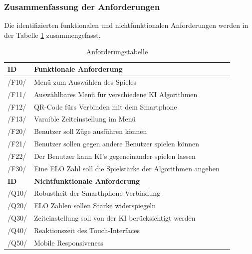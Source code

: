 \documentclass[12pt,a4paper,bibliography=totocnumbered,listof=totocnumbered]{article}
\begin{document}
\begin{appendix}
\subsubsection{Zusammenfassung der Anforderungen}
Die identifizierten funktionalen und nichtfunktionalen Anforderungen werden in der Tabelle \ref{tab:Anforderungen} zusammengefasst. 
\vspace{1em}
\begin{table}[!h]
	\centering
	\begin{tabular}{|l|l|l|}
		\hline
		\textbf{ID} & \textbf{Funktionale Anforderung}\\
		\hline
		/F10/ & Menü zum Auswählen des Spieles \\
		\hline
		/F11/ & Auswählbares Menü für verschiedene KI Algorithmen \\
		\hline
        /F12/ & QR-Code fürs Verbinden mit dem Smartphone \\
		\hline
		/F13/ & Varaible Zeiteinstellung im Menü \\
        \hline
		/F20/ & Benutzer soll Züge ausführen können \\
        \hline
		/F21/ & Benutzer sollen gegen andere Benutzer spielen können \\
        \hline
		/F22/ & Der Benutzer kann KI's gegeneinander spielen lassen \\
        \hline
		/F30/ & Eine ELO Zahl soll die Spielstärke der Algorithmen angeben \\
	
		\hline
		\textbf{ID} & \textbf{Nichtfunktionale Anforderung}\\
		\hline
		/Q10/ & Robustheit der Smarthphone Verbindung \\
        \hline
		/Q20/ & ELO Zahlen sollen Stärke widerspiegeln \\
        \hline
		/Q30/ & Zeiteinstellung soll von der KI berücksichtigt werden \\
        \hline
		/Q40/ & Reaktionszeit des Touch-Interfaces \\
        \hline
		/Q50/ & Mobile Responsiveness \\
		\hline
	\end{tabular}
	\caption{Anforderungstabelle}
	\label{tab:Anforderungen}
\end{table}

\pagebreak


\end{appendix}
\end{document}
